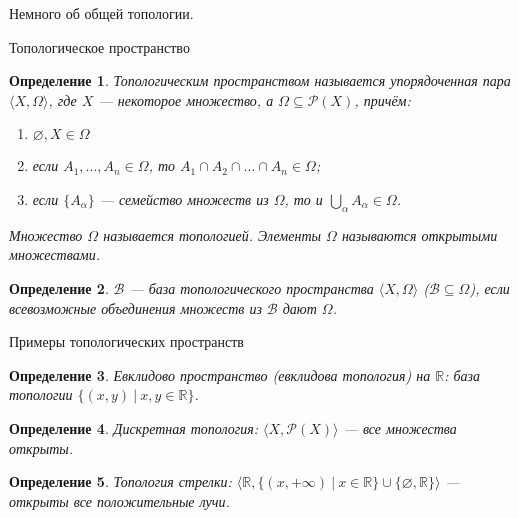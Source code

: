 \documentclass[aspectratio=169]{beamer}
\begin{document}
\newtheorem{axiom}{Аксиома}
\newtheorem{exmprus}{Пример}
\newtheorem{defrus}{Определение}
\newtheorem{lemmarus}{Лемма}
\newtheorem{thmrus}{Теорема}

\begin{frame}{}
\begin{center}\Large Немного об общей топологии.\end{center}
\end{frame}

\begin{frame}{Топологическое пространство}

\begin{defrus}Топологическим пространством называется упорядоченная пара $\langle X, \Omega \rangle$,
где $X$ --- некоторое множество, а $\Omega \subseteq \mathcal{P}(X)$, причём:
\begin{enumerate}
\item $\varnothing, X \in \Omega$
\item если $A_1, \dots, A_n \in \Omega$, то $A_1 \cap A_2 \cap \dots \cap A_n \in \Omega$;
\item если $\{A_\alpha\}$ --- семейство множеств из $\Omega$, то и $\bigcup_\alpha A_\alpha \in \Omega$.
\end{enumerate}

Множество $\Omega$ называется \emph{топологией}.
Элементы $\Omega$ называются открытыми множествами.
\end{defrus}


\begin{defrus}$\mathcal{B}$ --- \emph{база} топологического пространства $\langle X, \Omega\rangle$ ($\mathcal{B} \subseteq \Omega$), 
если всевозможные объединения множеств из $\mathcal{B}$ дают $\Omega$.
\end{defrus}
\end{frame}

\begin{frame}{Примеры топологических пространств}
\begin{defrus}Евклидово пространство (евклидова топология) на $\mathbb{R}$: база топологии $\{(x,y)\ |\ x,y \in \mathbb{R}\}$.\end{defrus}
\begin{defrus}Дискретная топология: $\langle X, \mathcal{P}(X) \rangle$ --- все множества открыты.\end{defrus}
\begin{defrus}Топология стрелки: $\langle \mathbb{R}, \{(x,+\infty)\ |\ x\in\mathbb{R}\}\cup\{\varnothing,\mathbb{R}\}\rangle$ --- открыты все положительные лучи.\end{defrus}
\end{frame}
\end{document}
